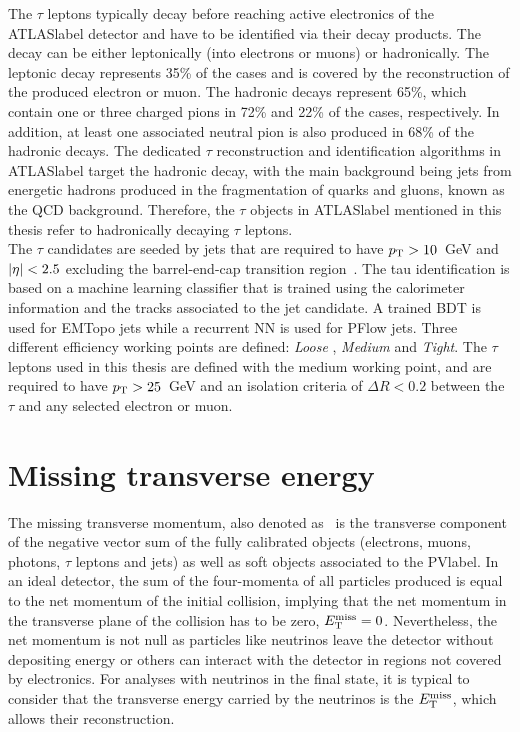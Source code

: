 The $\tau$ leptons typically decay before reaching active electronics of the \acrshort{ATLASlabel} detector and have to be identified via their decay products. The decay can be either leptonically (into electrons or muons) or hadronically. The leptonic decay represents 35\% of the cases and is covered by the reconstruction of the produced electron or muon. The hadronic decays represent 65\%, which contain one or three charged pions in 72\% and 22\% of the cases, respectively. In addition, at least one associated neutral pion is also produced in 68\% of the hadronic decays. The dedicated $\tau$ reconstruction and identification algorithms in \acrshort{ATLASlabel} target the hadronic decay, with the main background being jets from energetic hadrons produced in the fragmentation of quarks and gluons, known as the \acrshort{QCD} background. Therefore, the $\tau$ objects in \acrshort{ATLASlabel} mentioned in this thesis refer to hadronically decaying $\tau$ leptons. \\

The $\tau$ candidates are seeded by jets that are required to have $p_{\text{T}} > 10$~GeV and $\abs{\eta} < 2.5$ excluding the barrel-end-cap transition region~\cite{ATLAS-CONF-2017-029}. The tau identification is based on a machine learning classifier that is trained using the calorimeter information and the tracks associated to the jet candidate. A trained BDT is used for EMTopo jets while a recurrent NN is used for PFlow jets. Three different efficiency working points are defined: \textit{Loose
}, \textit{Medium} and \textit{Tight}. The $\tau$ leptons used in this thesis are defined with the medium working point, and are required to have $p_{\text{T}}>25$~GeV and an isolation criteria of $\Delta R<0.2$ between the $\tau$ and any selected electron or muon.

\section{Missing transverse energy}

The missing transverse momentum, also denoted as \MET\ is the transverse component of the negative vector sum of the fully calibrated objects (electrons, muons, photons, $\tau$ leptons and jets) as well as soft objects associated to the \acrshort{PVlabel}. In an ideal detector, the sum of the four-momenta of all particles produced is equal to the net momentum of the initial collision, implying that the net momentum in the transverse plane of the collision has to be zero, $E_{\text{T}}^{\text{miss}}=0$. Nevertheless, the net momentum is not null as particles like neutrinos leave the detector without depositing energy or others can interact with the detector in regions not covered by electronics. For analyses with neutrinos in the final state, it is typical to consider that the transverse energy carried by the neutrinos is the $E_{\text{T}}^{\text{miss}}$, which allows their reconstruction.